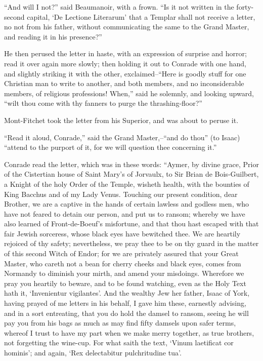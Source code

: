 ``And will I not?'' said Beaumanoir, with a frown. ``Is it not written
in the forty-second capital, `De Lectione Literarum' that a Templar
shall not receive a letter, no not from his father, without
communicating the same to the Grand Master, and reading it in his
presence?''

He then perused the letter in haste, with an expression of surprise and
horror; read it over again more slowly; then holding it out to Conrade
with one hand, and slightly striking it with the other,
exclaimed--``Here is goodly stuff for one Christian man to write to
another, and both members, and no inconsiderable members, of religious
professions! When,'' said he solemnly, and looking upward, ``wilt thou
come with thy fanners to purge the thrashing-floor?''

Mont-Fitchet took the letter from his Superior, and was about to peruse
it.

``Read it aloud, Conrade,'' said the Grand Master,--``and do thou'' (to
Isaac) ``attend to the purport of it, for we will question thee
concerning it.''

Conrade read the letter, which was in these words: ``Aymer, by divine
grace, Prior of the Cistertian house of Saint Mary's of Jorvaulx, to Sir
Brian de Bois-Guilbert, a Knight of the holy Order of the Temple,
wisheth health, with the bounties of King Bacchus and of my Lady Venus.
Touching our present condition, dear Brother, we are a captive in the
hands of certain lawless and godless men, who have not feared to detain
our person, and put us to ransom; whereby we have also learned of
Front-de-Boeuf's misfortune, and that thou hast escaped with that fair
Jewish sorceress, whose black eyes have bewitched thee. We are heartily
rejoiced of thy safety; nevertheless, we pray thee to be on thy guard in
the matter of this second Witch of Endor; for we are privately assured
that your Great Master, who careth not a bean for cherry cheeks and
black eyes, comes from Normandy to diminish your mirth, and amend your
misdoings. Wherefore we pray you heartily to beware, and to be found
watching, even as the Holy Text hath it, `Invenientur vigilantes'. And
the wealthy Jew her father, Isaac of York, having prayed of me letters
in his behalf, I gave him these, earnestly advising, and in a sort
entreating, that you do hold the damsel to ransom, seeing he will pay
you from his bags as much as may find fifty damsels upon safer terms,
whereof I trust to have my part when we make merry together, as true
brothers, not forgetting the wine-cup. For what saith the text, `Vinum
laetificat cor hominis'; and again, `Rex delectabitur pulchritudine
tua'.

